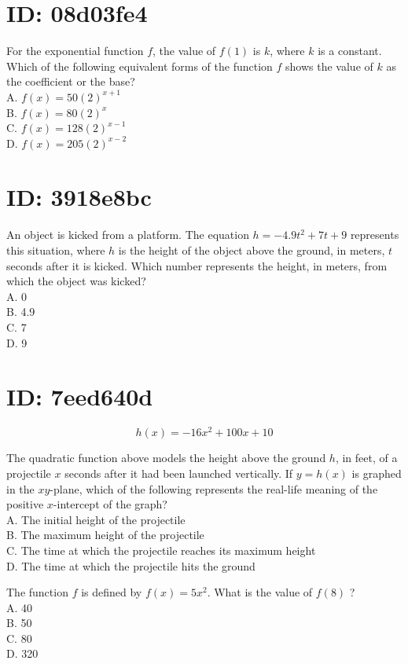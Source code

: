 \section*{ID: 08d03fe4}
For the exponential function $f$, the value of $f(1)$ is $k$, where $k$ is a constant. Which of the following equivalent forms of the function $f$ shows the value of $k$ as the coefficient or the base?\\
A. $f(x)=50(2)^{x+1}$\\
B. $f(x)=80(2)^{x}$\\
C. $f(x)=128(2)^{x-1}$\\
D. $f(x)=205(2)^{x-2}$

\section*{ID: 3918e8bc}
An object is kicked from a platform. The equation $h=-4.9 t^{2}+7 t+9$ represents this situation, where $h$ is the height of the object above the ground, in meters, $t$ seconds after it is kicked. Which number represents the height, in meters, from which the object was kicked?\\
A. 0\\
B. 4.9\\
C. 7\\
D. 9

\section*{ID: 7eed640d}
$$
h(x)=-16 x^{2}+100 x+10
$$

The quadratic function above models the height above the ground $h$, in feet, of a projectile $x$ seconds after it had been launched vertically. If $y=h(x)$ is graphed in the $x y$-plane, which of the following represents the real-life meaning of the positive $x$-intercept of the graph?\\
A. The initial height of the projectile\\
B. The maximum height of the projectile\\
C. The time at which the projectile reaches its maximum height\\
D. The time at which the projectile hits the ground

The function $f$ is defined by $f(x)=5 x^{2}$. What is the value of $f(8)$ ?\\
A. 40\\
B. 50\\
C. 80\\
D. 320

